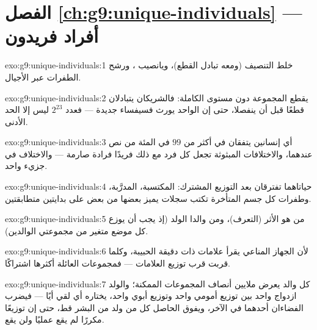 \section*{الفصل \ref{ch:g9:unique-individuals} --- أفراد فريدون}

\begin{solution}{exo:g9:unique-individuals:1}
خلط التنصيف (ومعه تبادل القطع)، ويانصيب ، ورشح
الطفرات عبر الأجيال.
\end{solution}

\begin{solution}{exo:g9:unique-individuals:2}
يقطع المجموعة دون مستوى  الكاملة: فالشريكان
يتبادلان قطعًا قبل أن ينفصلا، حتى إن  الواحد يورث
فسيفساء جديدة --- فعدد $2^{23}$ ليس إلا الحد الأدنى.
\end{solution}

\begin{solution}{exo:g9:unique-individuals:3}
أي إنسانين يتفقان في أكثر من $99$ في المئة من نص 
عندهما، والاختلافات المبثوثة تجعل كل فرد مع ذلك فريدًا
فرادة صارمة ---  والاختلاف في جزيء واحد.
\end{solution}

\begin{solution}{exo:g9:unique-individuals:4}
حياتاهما تفترقان بعد التوزيع المشترك:  المكتسبة،
 المدرَّبة، وطفرات كل جسم المتأخرة تكتب سجلات
يميز بعضها من بعض على بدايتين متطابقتين.
\end{solution}

\begin{solution}{exo:g9:unique-individuals:5}
 من هو الأثر (التعرف)، ومن والدا الولد (إذ يجب أن
يوزع كل موضع متغير من مجموعتي الوالدين).
\end{solution}

\begin{solution}{exo:g9:unique-individuals:6}
لأن الجهاز المناعي يقرأ علامات ذات دقيقة الحبيبة، وكلما
قربت  قرب توزيع العلامات --- فمجموعات العائلة
أكثرها اشتراكًا.
\end{solution}

\begin{solution}{exo:g9:unique-individuals:7}
كل والد يعرض ملايين أنصاف المجموعات الممكنة؛ والولد
ازدواج واحد بين توزيع أمومي واحد وتوزيع أبوي واحد،
يختاره أي  لقي أيًا --- فيضرب الفضاءان أحدهما في
الآخر، ويفوق الحاصل كل من ولد من البشر قط، حتى إن
توزيعًا مكررًا لم يقع عمليًا ولن يقع.
\end{solution}

